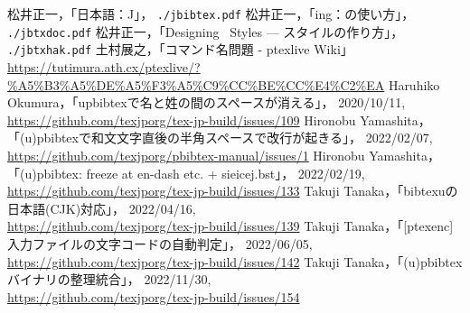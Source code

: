 \documentclass[a4paper,11pt,nomag,dvipdfmx]{jsarticle}
\def\file#1{\texttt{#1}}
\def\JBibTeX{\leavevmode\textcompwordmark\lower.5ex\hbox{J}\kern-.08em\BibTeX}
\def\JBibTeX{J\BibTeX}%
\begin{document}
\clearpage
\begin{thebibliography}{99}
  松井正一，「日本語\BibTeX ：\JBibTeX」，
  \file{./jbibtex.pdf}
  松井正一，「\BibTeX ing：\BibTeX の使い方」，
  \file{./jbtxdoc.pdf}
  松井正一，「Designing \BibTeX\ Styles --- \BibTeX スタイルの作り方」，
  \file{./jbtxhak.pdf}
  土村展之，「コマンド名問題 - ptexlive Wiki」\\
  \url{https://tutimura.ath.cx/ptexlive/?%A5%B3%A5%DE%A5%F3%A5%C9%CC%BE%CC%E4%C2%EA}
  Haruhiko Okumura，「upbibtexで名と姓の間のスペースが消える」，
  2020/10/11,\\
  \url{https://github.com/texjporg/tex-jp-build/issues/109}
  Hironobu Yamashita，「(u)pbibtexで和文文字直後の半角スペースで改行が起きる」，
  2022/02/07,\\
  \url{https://github.com/texjporg/pbibtex-manual/issues/1}
  Hironobu Yamashita，「(u)pbibtex: freeze at en-dash etc. + sieicej.bst」，
  2022/02/19,\\
  \url{https://github.com/texjporg/tex-jp-build/issues/133}
  Takuji Tanaka，「bibtexuの日本語(CJK)対応」，
  2022/04/16,\\
  \url{https://github.com/texjporg/tex-jp-build/issues/139}
  Takuji Tanaka，「[ptexenc] 入力ファイルの文字コードの自動判定」，
  2022/06/05,\\
  \url{https://github.com/texjporg/tex-jp-build/issues/142}
  Takuji Tanaka，「(u)pbibtex バイナリの整理統合」，
  2022/11/30,\\
  \url{https://github.com/texjporg/tex-jp-build/issues/154}
\end{thebibliography}
\end{document}
